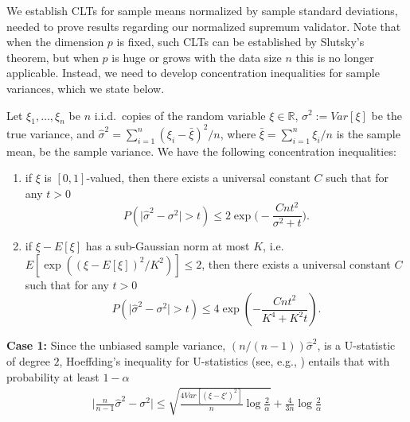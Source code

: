 \documentclass[mnsc,blindrev]{informs4} %
\newcommand{\R}{\mathbb{R}}
\begin{document}
We establish CLTs for sample means normalized by sample standard deviations, needed to prove results regarding our normalized supremum validator. Note that when the dimension $p$ is fixed, such CLTs can be established by Slutsky's theorem, but when $p$ is huge or grows with the data size $n$ this is no longer applicable. Instead, we need to develop concentration inequalities for sample variances, which we state below.
\begin{lemma}\label{concentration:variance}
Let $\xi_1,\ldots,\xi_n$ be $n$ i.i.d.~copies of the random variable $\xi\in\R$, $\sigma^2:=Var[\xi]$ be the true variance, and $\hat\sigma^2=\sum_{i=1}^n(\xi_i-\bar{\xi})^2/n$, where $\bar{\xi}=\sum_{i=1}^n\xi_i/n$ is the sample mean, be the sample variance. We have the following concentration inequalities:
\begin{enumerate}
\item[1.]if $\xi$ is $[0,1]$-valued, then there exists a universal constant $C$ such that for any $t>0$
\begin{equation}\label{case:ccp}
P(\lvert\hat\sigma^2-\sigma^2\rvert>t)\leq 2\exp\big(-\frac{Cnt^2}{\sigma^2+t}\big).
\end{equation}
\item[2.]if $\xi-E[\xi]$ has a sub-Gaussian norm at most $K$, i.e.~$E[\exp((\xi-E[\xi])^2/K^2)]\leq 2$, then there exists a universal constant $C$ such that for any $t>0$
\begin{equation}\label{case:generalcvx}
P(\lvert\hat\sigma^2-\sigma^2\rvert>t)\leq 4\exp(-\frac{Cnt^2}{K^4+K^2t}).
\end{equation}
\end{enumerate}

\end{lemma}
\textbf{Case 1:} Since the unbiased sample variance, $(n/(n-1))\hat\sigma^2$, is a U-statistic of degree $2$, Hoeffding's inequality for U-statistics (see, e.g., \cite{hoeffding1963probability,peel2010empirical}) entails that with probability at least $1-\alpha$
\begin{align*}
\lvert\frac{n}{n-1}\hat\sigma^2-\sigma^2\rvert\leq \sqrt{\frac{4Var[(\xi-\xi')^2]}{n}\log \frac{2}{\alpha}}+\frac{4}{3n}\log\frac{2}{\alpha}
\end{align*}
\end{document}
